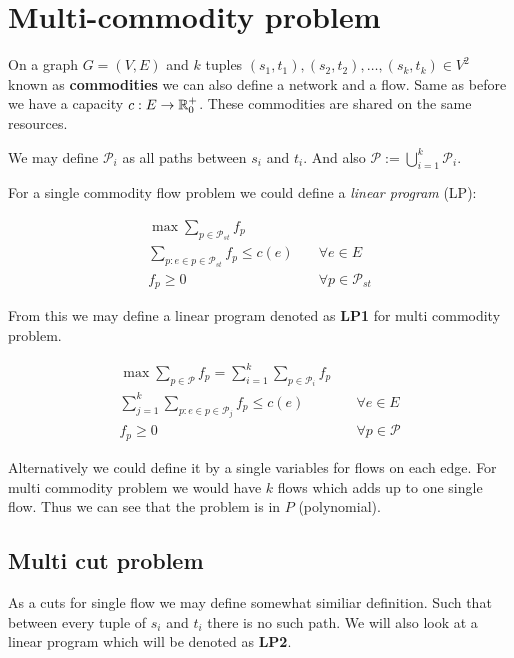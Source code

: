\chapter{Multi-commodity problem}

On a graph $G = (V,E)$ and $k$ tuples $(s_{1}, t_{1}), (s_{2}, t_{2}), \dots, (s_{k}, t_{k}) \in V^{2}$ known as \textbf{commodities} we can also define a network and a flow. Same as before we have a capacity $c: E \to \mathbb{R}_{0}^{+}$. These commodities are shared on the same resources.

We may define $\mathcal{P}_{i}$ as all paths between $s_{i}$ and $t_{i}$. And also $\mathcal{P} := \bigcup_{i = 1}^{k} \mathcal{P}_{i}$.

For a single commodity flow problem we could define a \textit{linear program} (LP):

$$
\begin{aligned}
	\max \sum_{p \in \mathcal{P}_{st}} f_{p} \\
	\sum_{p: e \in p \in \mathcal{P}_{st}} f_{p} \leq c(e) &\quad \forall e \in E\\
	f_p \geq 0 &\quad \forall p \in \mathcal{P}_{st}
\end{aligned}
$$

From this we may define a linear program denoted as \textbf{LP1} for multi commodity problem.

$$
\begin{aligned}
	\max \sum_{p \in \mathcal{P}} f_{p} = \sum_{i = 1}^{k} \sum_{p \in \mathcal{P}_{i}} f_{p} \\
	\sum_{j = 1}^{k} \sum_{p: e \in p \in \mathcal{P}_{j}} f_{p} \leq c(e) & \quad \forall e \in E\\
	f_p \geq 0 & \quad \forall p \in \mathcal{P}
\end{aligned}
$$

Alternatively we could define it by a single variables for flows on each edge. For multi commodity problem we would have $k$ flows which adds up to one single flow. Thus we can see that the problem is in $P$ (polynomial).

\section{Multi cut problem}

As a cuts for single flow we may define somewhat similiar definition. Such that between every tuple of $s_{i}$ and $t_{i}$ there is no such path. We will also look at a linear program which will be denoted as \textbf{LP2}.

